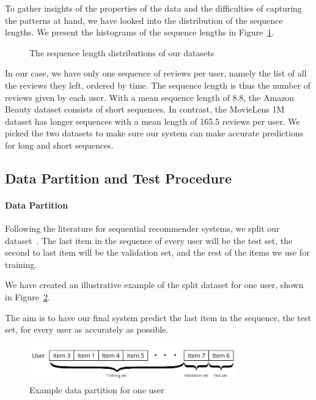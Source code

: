 To gather insights of the properties of the data and the difficulties of capturing the patterns at hand, we have looked into the distribution of the sequence lengths.
We present the histograms of the sequence lengths in Figure~\ref{fig:seq_len_dist}.

\begin{figure}[htbp]
    \centering
    \caption{The sequence length distributions of our datasets}
    \label{fig:seq_len_dist}
\end{figure}

In our case, we have only one sequence of reviews per user, namely the list of all the reviews they left, ordered by time. The sequence length is thus the number of reviews given by each user. With a mean sequence length of 8.8, the Amazon Beauty dataset consists of short sequences. In contrast, the MovieLens 1M dataset has longer sequences with a mean length of 165.5 reviews per user. We picked the two datasets to make sure our system can make accurate predictions for long and short sequences.


\subsection{Data Partition and Test Procedure}

\paragraph{Data Partition}
\label{paragraph:data_partition}
Following the literature for sequential recommender systems, we split our dataset~\cite{kang2018self, sun2019bert4rec}. The last item in the sequence of every user will be the test set, the second to last item will be the validation set, and the rest of the items we use for training.

We have created an illustrative example of the split dataset for one user, shown in Figure~\ref{fig:datasplit}.

The aim is to have our final system predict the last item in the sequence, the test set, for every user as accurately as possible.

\begin{figure}[htbp]
\centering
\includegraphics[width=0.8\textwidth]{images/illustrations/datasplit.png}
\caption{Example data partition for one user}
\label{fig:datasplit}
\end{figure}


